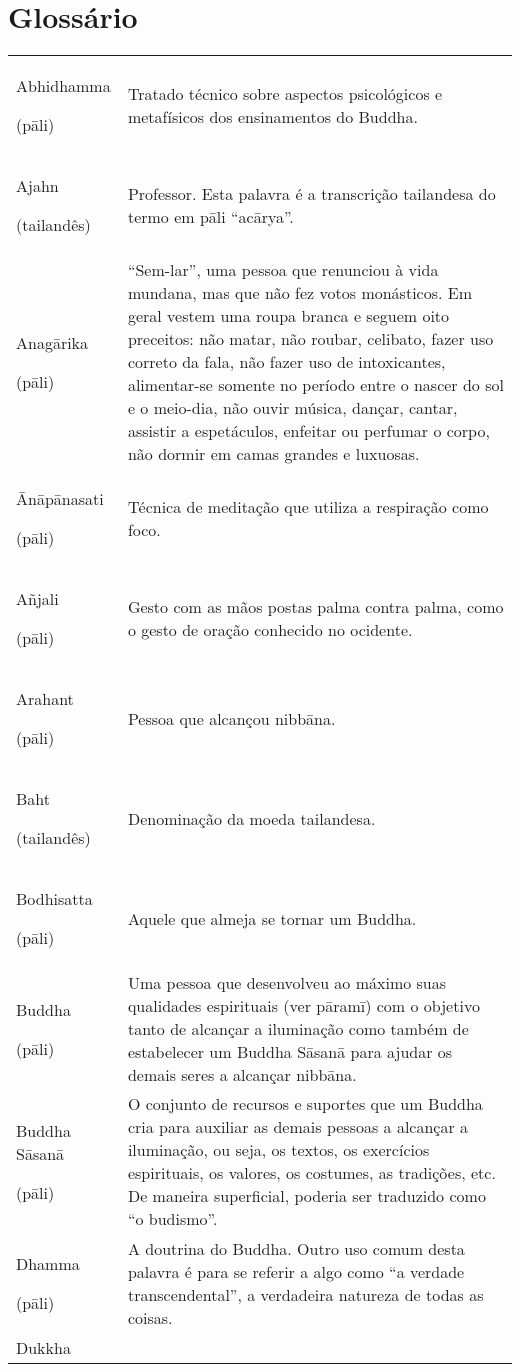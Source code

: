 \chapter{Glossário}

\begin{longtable}[c]{@{}ll@{}}
\toprule
Abhidhamma

(pāli) & Tratado técnico sobre aspectos psicológicos e metafísicos dos
ensinamentos do Buddha.\tabularnewline
Ajahn

(tailandês) & Professor. Esta palavra é a transcrição tailandesa do
termo em pāli ``acārya''.\tabularnewline
Anagārika

(pāli) & ``Sem-lar'', uma pessoa que renunciou à vida mundana, mas que
não fez votos monásticos. Em geral vestem uma roupa branca e seguem oito
preceitos: não matar, não roubar, celibato, fazer uso correto da fala,
não fazer uso de intoxicantes, alimentar-se somente no período entre o
nascer do sol e o meio-dia, não ouvir música, dançar, cantar, assistir a
espetáculos, enfeitar ou perfumar o corpo, não dormir em camas grandes e
luxuosas.\tabularnewline
Ānāpānasati

(pāli) & Técnica de meditação que utiliza a respiração como
foco.\tabularnewline
Añjali

(pāli) & Gesto com as mãos postas palma contra palma, como o gesto de
oração conhecido no ocidente.\tabularnewline
Arahant

(pāli) & Pessoa que alcançou nibbāna.\tabularnewline
Baht

(tailandês) & Denominação da moeda tailandesa.\tabularnewline
Bodhisatta

(pāli) & Aquele que almeja se tornar um Buddha.\tabularnewline
Buddha

(pāli) & Uma pessoa que desenvolveu ao máximo suas qualidades
espirituais (ver pāramī) com o objetivo tanto de alcançar a iluminação
como também de estabelecer um Buddha Sāsanā para ajudar os demais seres
a alcançar nibbāna.\tabularnewline
Buddha Sāsanā

(pāli) & O conjunto de recursos e suportes que um Buddha cria para
auxiliar as demais pessoas a alcançar a iluminação, ou seja, os textos,
os exercícios espirituais, os valores, os costumes, as tradições, etc.
De maneira superficial, poderia ser traduzido como ``o
budismo''.\tabularnewline
Dhamma

(pāli) & A doutrina do Buddha. Outro uso comum desta palavra é para se
referir a algo como ``a verdade transcendental'', a verdadeira natureza
de todas as coisas.\tabularnewline
Dukkha


\end{longtable}
